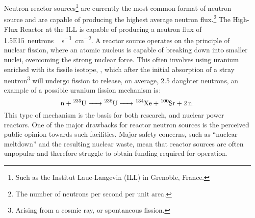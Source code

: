 Neutron reactor sources\footnote{Such as the Institut Laue-Langevin (ILL) in Grenoble, France.} are currently the most common format of neutron source and are capable of producing the highest average neutron flux.\footnote{The number of neutrons per second per unit area.}
The High-Flux Reactor at the ILL is capable of producing a neutron flux of \SI{1.5E15}{neutrons\,\second^{-1}\centi\meter^{-2}}.
A reactor source operates on the principle of nuclear fission, where an atomic nucleus is capable of breaking down into smaller nuclei, overcoming the strong nuclear force. This often involves using uranium enriched with its fissile isotope, , which after the initial absorption of a stray neutron\footnote{Arising from a cosmic ray, or spontaneous fission.} will undergo fission to release, on average, 2.5 daughter neutrons, an example of a possible uranium fission mechanism is:
%
\begin{equation*}
    \ce{n + ^{235}U -> ^{236}U -> ^{134}Xe + ^{100}Sr + 2n}.
\end{equation*}
%
This type of mechanism is the basis for both research, and nuclear power reactors.
One of the major drawbacks for reactor neutron sources is the perceived public opinion towards such facilities.
Major safety concerns, such as ``nuclear meltdown'' and the resulting nuclear waste, mean that reactor sources are often unpopular and therefore struggle to obtain funding required for operation.

